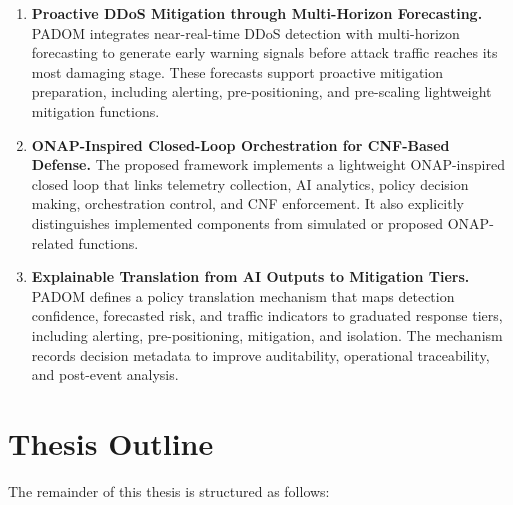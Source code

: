 \documentclass[12pt, a4paper, reqno, oneside]{book}
\begin{document}
\begin{enumerate}
    \item \textbf{Proactive DDoS Mitigation through Multi-Horizon Forecasting.}
    PADOM integrates near-real-time DDoS detection with multi-horizon
    forecasting to generate early warning signals before attack traffic reaches
    its most damaging stage. These forecasts support proactive mitigation
    preparation, including alerting, pre-positioning, and pre-scaling lightweight
    mitigation functions.

    \item \textbf{ONAP-Inspired Closed-Loop Orchestration for CNF-Based Defense.}
    The proposed framework implements a lightweight ONAP-inspired closed loop
    that links telemetry collection, AI analytics, policy decision making,
    orchestration control, and CNF enforcement. It also explicitly distinguishes
    implemented components from simulated or proposed ONAP-related functions.

    \item \textbf{Explainable Translation from AI Outputs to Mitigation Tiers.}
    PADOM defines a policy translation mechanism that maps detection confidence,
    forecasted risk, and traffic indicators to graduated response tiers, including
    alerting, pre-positioning, mitigation, and isolation. The mechanism records
    decision metadata to improve auditability, operational traceability, and
    post-event analysis.
\end{enumerate}

\section{Thesis Outline}

The remainder of this thesis is structured as follows:
\end{document}
